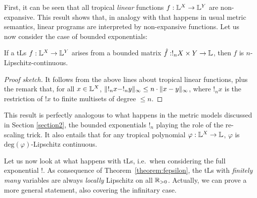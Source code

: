 \documentclass[submission,%
]{eptcs}
\begin{document}
First, it can be seen that all tropical \emph{linear} functions $f: \mathbb{L}^{X}\to \mathbb{L}^{Y}$ are non-expansive.  
This result shows that, in analogy with that happens in usual metric semantics, linear programs are interpreted by non-expansive functions. 
Let us now consider the case of bounded exponentials:
\begin{proposition}\label{prop:boundedlip}
If a tLs $f: \mathbb{L}^{X}\to \mathbb{L}^{Y}$ arises from a bounded matrix $\hat{f}:!_{n}X\times Y\to \mathbb{L}$, then $f$ is $n$-Lipschitz-continuous.
\end{proposition}
\begin{proof}[Proof sketch]
It follows from the above lines about tropical linear functions, plus the remark that, for all $x\in \mathbb{L}^{X}$, $\lVert !_{n} x-!_{n} y\rVert_{\infty}\leq n\cdot \lVert x- y\rVert_{\infty}$, where $!_{n} x$ is the restriction of $! x$ to finite multisets of degree $\leq n$.%
\end{proof}
This result is perfectly analogous to what happens in the metric models discussed in Section \ref{section2}, the bounded exponentials $!_{n}$ playing the role of the re-scaling trick.
It also entails that for any tropical polynomial $\varphi:\mathbb{L}^{X}\to\mathbb{L}$, $\varphi$ is $\mathrm{deg}(\varphi)$-Lipschitz continuous.


Let us now look at what happens with tLs, i.e.~when considering the full exponential $!$.
As consequence of Theorem~\ref{theorem:fepsilon}, the tLs with \emph{finitely many} variables are always \emph{locally} Lipschitz on all $\mathbb{R}_{>0}$.
Actually, we can prove a more general statement, also covering the infinitary case.
\end{document}
